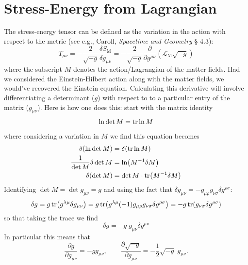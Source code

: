 \documentclass{report}
\begin{document}
\section{Stress-Energy from Lagrangian}\label{eq:stress-energy-from-lagrangian}
The stress-energy tensor can be defined as the variation in the action with
respect to the metric (see e.g., Caroll, \textit{Spacetime and Geometry} \S
4.3):
\begin{equation*}
	T_{\mu\nu}
		= - \frac{2}{\sqrt{-g}} \frac{\delta S_\text{M}}{\delta g_{\mu\nu}}
		= - \frac{2}{\sqrt{-g}} 
			\frac{\partial }{\partial g^{\mu\nu}}(\mathcal{L}_{\text{M}} \sqrt{-g})
\end{equation*}
where the subscript $ M $ denotes the action/Lagrangian of the matter fields. 
Had we considered the Einstein-Hilbert action along with the matter fields, 
we would've recovered the Einstein equation.
Calculating this derivative will involve differentiating a determinant ($ g $)
with respect to to a particular entry of the matrix ($ g_{\mu\nu} $). Here is 
how one does this: start with the matrix identity 
\begin{equation*}
	\ln \det M = \tr \ln M 
\end{equation*}
where considering a variation in $ M $ we find this equation becomes 
\begin{align*}
	\delta(\ln \det M) &= \delta(\tr \ln M) \\ 
	\frac{1}{\det M} \delta \det M &= \ln (M^{-1} \delta M)\\ 
	\delta (\det M) &= \det M\cdot \tr (M^{-1} \delta M)
\end{align*}
Identifying $ \det M = \det g_{\mu\nu} = g $ and using the fact that 
$ \delta g_{\mu\nu} = -g_{\mu\rho} g_{\nu\sigma} \delta g^{\rho \sigma}$:
\begin{align*}
	\delta g = g \tr (g^{\lambda \mu} \delta g_{\mu\nu})
			 = g \tr (g^{\lambda\mu} (-1) g_{\mu\rho}g_{\nu\sigma} \delta g^{\rho\sigma})
			 = -g \tr (g_{\nu\sigma} \delta g^{\rho\sigma}) 
\end{align*}
so that taking the trace we find 
\begin{equation*}
	\delta g = - g \;  g_{\mu\nu} \delta g^{\mu\nu}
\end{equation*}
In particular this means that 
\begin{equation*}
	\frac{\partial g}{\partial g_{\mu\nu}} = -g g_{\mu\nu},\qquad 
	\frac{\partial \sqrt{-g}}{\partial g_{\mu\nu}} 
		= - \frac{1}{2} \sqrt{-g} \;g_{\mu\nu}.
\end{equation*}
\end{document}
